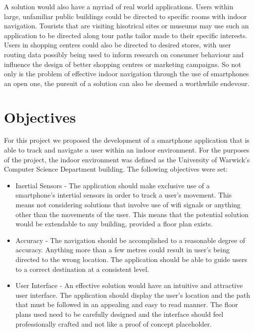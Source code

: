 \documentclass[main.tex]{subfiles}
\begin{document}
A solution would also have a myriad of real world applications. Users within large, unfamiliar public buildings could be directed to specific rooms with indoor navigation. Tourists that are visiting hisotrical sites or museums may use such an application to be directed along tour paths tailor made to their specific interests. Users in shopping centres could also be directed to desired stores, with user routing data possibly being used to inform research on consumer behaviour and influence the design of better shopping centres or marketing campaigns. So not only is the problem of effective indoor navigation through the use of smartphones an open one, the pursuit of a solution can also be deemed a worthwhile endevour.

\section{Objectives}

For this project we proposed the development of a smartphone application that is able to track and navigate a user within an indoor environment. For the purposes of the project, the indoor environment was defined as the University of Warwick's Computer Science Department building. The following objectives were set:\\

\begin{itemize}
\item Inertial Sensors - The application should make exclusive use of a smartphone's intertial sensors in order to track a user's movement. This means not considering solutions that involve use of wifi signals or anything other than the movements of the user. This means that the potential solution would be extendable to any building, provided a floor plan exists. 

\item Accuracy - The navigation should be accomplished to a reasonable degree of accuracy. Anything more than a few metres could result in user's being directed to the wrong location. The application should be able to guide users to a correct destination at a consistent level.

\item User Interface - An effective solution would have an intuitive and attractive user interface. The application should display the user's location and the path that must be followed in an appealing and easy to read manner. The floor plans used need to be carefully designed and the interface should feel professionally crafted and not like a proof of concept placeholder.

\end{itemize}
\end{document}
